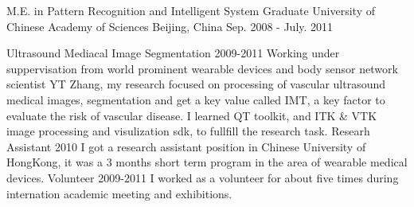 

\begin{cventries}

  \cventry
   {M.E. in Pattern Recognition and Intelligent System}
   {Graduate University of Chinese Academy of Sciences}
   {Beijing, China}
   {Sep. 2008 - July. 2011}
   {
     \begin{cvsubentries}
       \cvsubentry
         {}
         {Ultrasound Mediacal Image Segmentation}
         {2009-2011}
         {Working under suppervisation from world prominent wearable devices and body sensor network scientist YT Zhang, my research focused on processing of vascular ultrasound medical images, segmentation and get a key value called IMT, a key factor to evaluate the risk of vascular disease. I learned QT toolkit, and ITK \& VTK image processing and visulization sdk, to fullfill the research task.}
       \cvsubentry
         {}
         {Researh Assistant}
         {2010}
         {I got a research assistant position in Chinese University of HongKong, it was a 3 months short term program in the area of wearable medical devices.}
       \cvsubentry
         {}
         {Volunteer}
         {2009-2011}
         {I worked as a volunteer for about five times during internation academic meeting and exhibitions.}
     \end{cvsubentries}
   }
   

\end{cventries}
